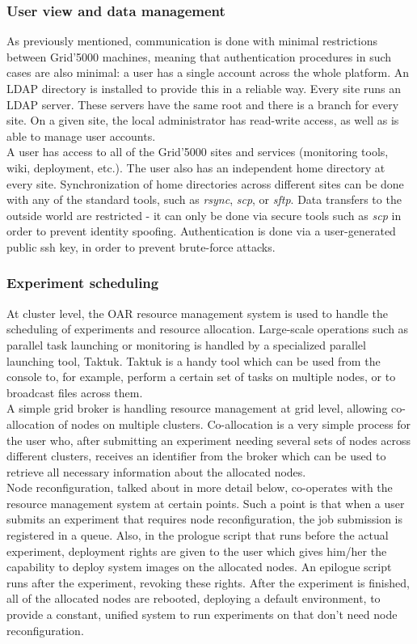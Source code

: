 \subsubsection{User view and data management}
As previously mentioned, communication is done with minimal
restrictions between Grid'5000 machines, meaning that authentication
procedures in such cases are also minimal: a user has a single account
across the whole platform. An LDAP directory is installed to provide
this in a reliable way. Every site runs an LDAP server. These servers
have the same root and there is a branch for every site. On a given
site, the local administrator has read-write access, as well as is
able to manage user accounts.\\[0.3cm]
A user has access to all of the Grid'5000 sites and services
(monitoring tools, wiki, deployment, etc.). The user also has an
independent home directory at every site. Synchronization of home
directories across different sites can
be done with any of the standard tools, such as \emph{rsync},
\emph{scp}, or \emph{sftp}. Data transfers to the outside world are
restricted - it can only be done via secure tools such as \emph{scp}
in order to prevent identity spoofing. Authentication is done via a
user-generated public ssh key, in order to prevent brute-force
attacks.
\subsubsection{Experiment scheduling}
\label{sec:experiment_scheduling}
At cluster level, the OAR\cite{xdghmmnr05} resource management system is
used to handle the scheduling of experiments and resource
allocation. Large-scale operations such as parallel task launching or
monitoring is handled by a specialized parallel launching tool,
Taktuk\cite{chr09}. Taktuk is a handy tool which can be used from the
console to, for example, perform a certain set of tasks on multiple
nodes, or to broadcast files across them.\\[0.3cm]
A simple grid broker is handling resource management at grid
level, allowing co-allocation of nodes on multiple
clusters. Co-allocation is a very simple process for the user who,
after submitting an experiment needing several sets of nodes across
different clusters, receives an identifier from the broker which can
be used to retrieve all necessary information about the allocated
nodes.\\[0.3cm]
Node reconfiguration, talked about in more detail below, co-operates
with the resource management system at certain points. Such a point is
that when a user submits an experiment that requires node
reconfiguration, the job submission is registered in a queue. Also, in
the prologue script that runs before the actual experiment, deployment
rights are given to the user which gives him/her the capability to
deploy system images on the allocated nodes. An epilogue script runs
after the experiment, revoking these rights. After the experiment is
finished, all of the allocated nodes are rebooted, deploying a default
environment, to provide a constant, unified system to run experiments
on that don't need node reconfiguration.
